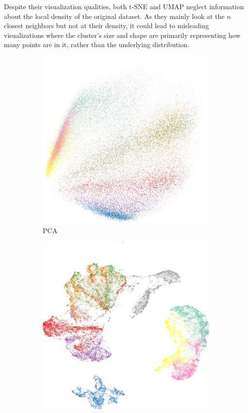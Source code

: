 Despite their visualization qualities, both t-SNE and UMAP neglect information about the local density of the original dataset. As they mainly look at the $n$ closest neighbors but not at their density, it could lead to misleading visualizations where the cluster's size and shape are primarily representing how many points are in it, rather than the underlying distribution.
\begin{figure}[h]
    \centering
    \begin{subfigure}[b]{0.33\textwidth}
        \centering
        \includegraphics[width=\textwidth]{img/fashion-pca.png}
        \caption{PCA}
        \label{fig:fas-pca}
    \end{subfigure}
    \begin{subfigure}[b]{0.3\textwidth}
        \centering
        \includegraphics[width=\textwidth]{img/fashion-umap.png}

\end{subfigure}
\end{figure}
